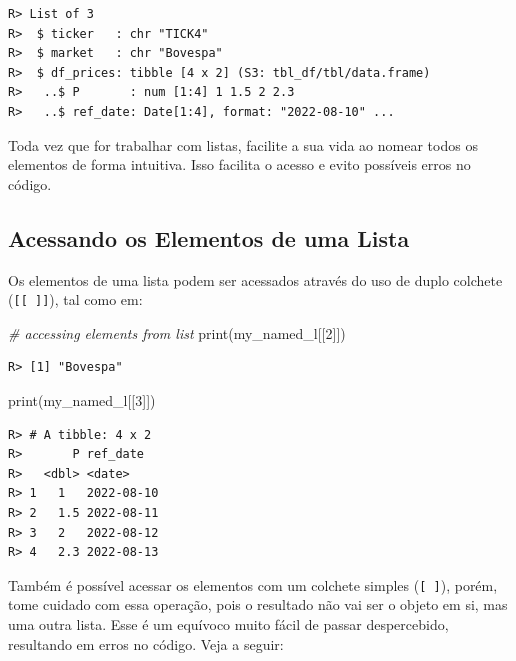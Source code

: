 \documentclass[
  11pt,
]{book}
\newenvironment{Shaded}{\begin{snugshade}}{\end{snugshade}}
\newcommand{\CommentTok}[1]{\textcolor[rgb]{0.37,0.37,0.37}{\textit{#1}}}
\newcommand{\DecValTok}[1]{\textcolor[rgb]{0.06,0.06,0.06}{#1}}
\newcommand{\FunctionTok}[1]{\textcolor[rgb]{0,0,0}{#1}}
\newcommand{\NormalTok}[1]{#1}
\newenvironment{rmdimportant}
{\begin{importantblock}

	} {\end{importantblock}}
\begin{document}
\begin{verbatim}
R> List of 3
R>  $ ticker   : chr "TICK4"
R>  $ market   : chr "Bovespa"
R>  $ df_prices: tibble [4 x 2] (S3: tbl_df/tbl/data.frame)
R>   ..$ P       : num [1:4] 1 1.5 2 2.3
R>   ..$ ref_date: Date[1:4], format: "2022-08-10" ...
\end{verbatim}

\begin{rmdimportant}
Toda vez que for trabalhar com listas, facilite a sua vida ao nomear
todos os elementos de forma intuitiva. Isso facilita o acesso e evito
possíveis erros no código.
\end{rmdimportant}

\hypertarget{acessando-os-elementos-de-uma-lista}{%
\subsection{Acessando os Elementos de uma Lista}\label{acessando-os-elementos-de-uma-lista}}

Os elementos de uma lista podem ser acessados através do uso de duplo colchete (\texttt{{[}{[}\ {]}{]}}), tal como em:

\begin{Shaded}
\begin{Highlighting}[]
\CommentTok{\# accessing elements from list}
\FunctionTok{print}\NormalTok{(my\_named\_l[[}\DecValTok{2}\NormalTok{]])}
\end{Highlighting}
\end{Shaded}

\begin{verbatim}
R> [1] "Bovespa"
\end{verbatim}

\begin{Shaded}
\begin{Highlighting}[]
\FunctionTok{print}\NormalTok{(my\_named\_l[[}\DecValTok{3}\NormalTok{]])}
\end{Highlighting}
\end{Shaded}

\begin{verbatim}
R> # A tibble: 4 x 2
R>       P ref_date  
R>   <dbl> <date>    
R> 1   1   2022-08-10
R> 2   1.5 2022-08-11
R> 3   2   2022-08-12
R> 4   2.3 2022-08-13
\end{verbatim}

Também é possível acessar os elementos com um colchete simples (\texttt{{[}\ {]}}), porém, tome cuidado com essa operação, pois o resultado não vai ser o objeto em si, mas uma outra lista. Esse é um equívoco muito fácil de passar despercebido, resultando em erros no código. Veja a seguir:
\end{document}
